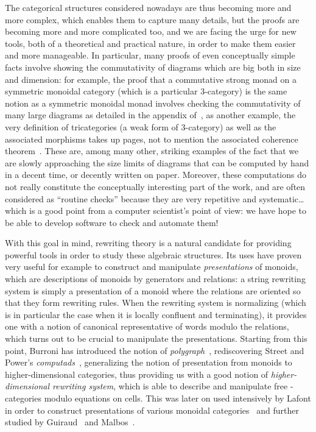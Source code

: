 \documentclass{LMCS}
\begin{document}
The categorical structures considered nowadays are thus becoming more and more
complex, which enables them to capture many details, but the proofs are becoming
more and more complicated too, and we are facing the urge for new tools, both of
a theoretical and practical nature, in order to make them easier and more
manageable. In particular, many proofs of even conceptually simple facts involve
showing the commutativity of diagrams which are big both in size and dimension:
for example, the proof that a commutative strong monad on a symmetric monoidal
category (which is a particular 3-category) is the same notion as a symmetric
monoidal monad involves checking the commutativity of many large diagrams as
detailed in the appendix of~\cite{goubault:logical-relations}, as another
example, the very definition of tricategories (a weak form of 3-category) as
well as the associated morphisms takes up pages, not to mention the associated
coherence theorem~\cite{gordon-power-street:coh-tricat, gurski:tricat}. These
are, among many other, striking examples of the fact that we are slowly
approaching the size limits of diagrams that can be computed by hand in a decent
time, or decently written on paper. Moreover, these computations do not really
constitute the conceptually interesting part of the work, and are often
considered as ``routine checks'' because they are very repetitive and
systematic\ldots which is a good point from a computer scientist's point of
view: we have hope to be able to develop software to check and automate them!

\bigskip

With this goal in mind, rewriting theory is a natural candidate for providing
powerful tools in order to study these algebraic structures. Its uses have
proven very useful for example to construct and manipulate \emph{presentations}
of monoids, which are descriptions of monoids by generators and relations: a
string rewriting system is simply a presentation of a monoid where the relations
are oriented so that they form rewriting rules. When the rewriting system is
normalizing (which is in particular the case when it is locally confluent and
terminating), it provides one with a notion of canonical representative of words
modulo the relations, which turns out to be crucial to manipulate the
presentations. Starting from this point, Burroni has introduced the notion of
\emph{polygraph}~\cite{burroni:higher-word}, rediscovering Street and Power's
\emph{computads}~\cite{street:limit-indexed-by-functors, power:n-cat-pasting},
generalizing the notion of presentation from monoids to higher-dimensional
categories, thus providing us with a good notion of \emph{higher-dimensional
  rewriting system}, which is able to describe and manipulate free
-categories modulo equations on \nbd{}cells. This was later on used intensively
by Lafont in order to construct presentations of various monoidal
categories~\cite{lafont:boolean-circuits} and further studied by
Guiraud~\cite{guiraud:these, guiraud:termination-3-rewr,
  guiraud:three-dimensions-proofs, guiraud:presentations-petri-nets} and
Malbos~\cite{guiraud-malbos:higher-cat-fdt}.
\end{document}
